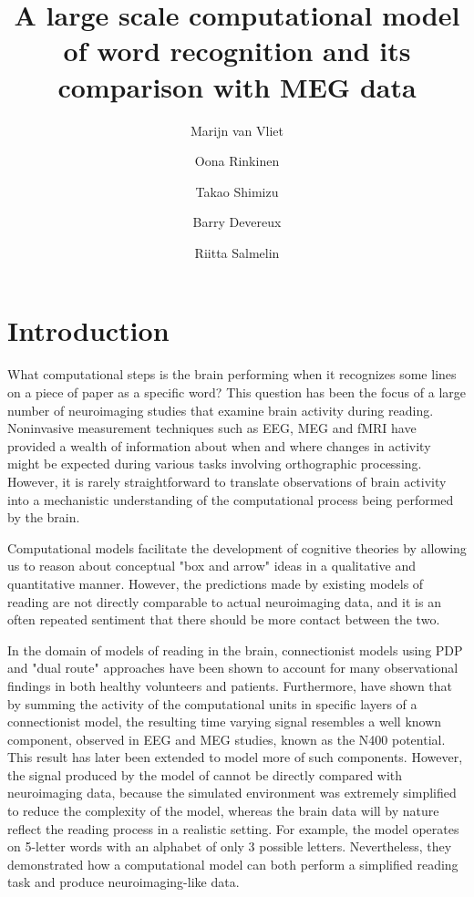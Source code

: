 \documentclass[a4paper, 10pt]{vanvliet_paper}
\title{A large scale computational model of word recognition and its comparison with MEG data}
\author[1*]{Marijn van Vliet}
\author[1]{Oona Rinkinen}
\author[1]{Takao Shimizu}
\author[2]{Barry Devereux}
\author[1]{Riitta Salmelin}
\affil[1]{Department of Neuroscience and Biomedical Engineering, Aalto University}
\affil[2]{School of Electronics, Electrical Engineering and Computer Science, Queen's University Belfast}
\affil[*]{Corresponding author: marijn.vanvliet@aalto.fi}
\begin{document}
\maketitle

\begin{abstract}
\end{abstract}

\section{Introduction}

What computational steps is the brain performing when it recognizes some lines on a piece of paper as a specific word?
This question has been the focus of a large number of neuroimaging studies that examine brain activity during reading.
Noninvasive measurement techniques such as \gls{EEG}\cite{Grainger2009}, \gls{MEG}\cite{Salmelin2007} and \gls{fMRI}\cite{Price2012} have provided a wealth of information about when and where changes in activity might be expected during various tasks involving orthographic processing\cite{Carreiras2014}.
However, it is rarely straightforward to translate observations of brain activity into a mechanistic understanding of the computational process being performed by the brain\cite{Poeppel2012}.

Computational models facilitate the development of cognitive theories by allowing us to reason about conceptual "box and arrow" ideas in a qualitative and quantitative manner\cite{Barber2007, Price2018}.
However, the predictions made by existing models of reading are not directly comparable to actual neuroimaging data, and it is an often repeated sentiment that there should be more contact between the two\cite{Carreiras2014, Laszlo2012, Laszlo2014, Poeppel2012, Taylor2013}.

In the domain of models of reading in the brain, connectionist models using \gls{PDP}\cite{McClelland2003} and "dual route" approaches\cite{Perry2007} have been shown to account for many observational findings in both healthy volunteers and patients\cite{McLeod2000, McClelland2003, Perry2007}.
Furthermore, \textcite{Laszlo2012} have shown that by summing the activity of the computational units in specific layers of a connectionist model, the resulting time varying signal resembles a well known component, observed in \gls{EEG} and \gls{MEG} studies, known as the N400 potential\cite{Kutas2011}.
This result has later been extended to model more of such components\cite{Laszlo2014}.
However, the signal produced by the model of \textcite{Laszlo2012} cannot be directly compared with neuroimaging data, because the simulated environment was extremely simplified to reduce the complexity of the model, whereas the brain data will by nature reflect the reading process in a realistic setting.
For example, the model operates on 5-letter words with an alphabet of only 3 possible letters.
Nevertheless, they demonstrated how a computational model can both perform a simplified reading task and produce neuroimaging-like data.
\end{document}
